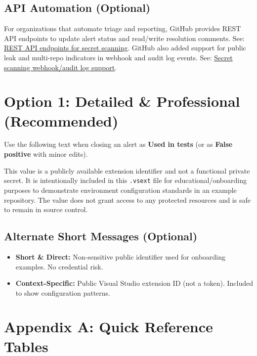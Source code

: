 \documentclass[11pt]{article}
\providecommand{\term}[1]{\textbf{#1}}
\newcommand{\codeinline}[1]{\texttt{#1}}
\begin{document}
\subsection{API Automation (Optional)}
For organizations that automate triage and reporting, GitHub provides REST API endpoints to update alert status and read/write resolution comments. See: \href{https://docs.github.com/en/rest/secret-scanning/secret-scanning}{REST API endpoints for secret scanning}. GitHub also added support for public leak and multi-repo indicators in webhook and audit log events. See: \href{https://github.blog/changelog/2024-10-24-secret-scanning-support-for-public-leak-and-multi-repository-indicators-in-webhook-and-audit-log-events/}{Secret scanning webhook/audit log support}.

\section{Option 1: Detailed \& Professional (Recommended)}
Use the following text when closing an alert as \term{Used in tests} (or as \term{False positive} with minor edits).

\begin{tcolorbox}[colback=LightGray,colframe=Gray,title=Dismissal Message (Detailed \& Professional)]
This value is a publicly available extension identifier and not a functional private secret. It is intentionally included in this \codeinline{.vsext} file for educational/onboarding purposes to demonstrate environment configuration standards in an example repository. The value does not grant access to any protected resources and is safe to remain in source control.
\end{tcolorbox}

\subsection{Alternate Short Messages (Optional)}
\begin{itemize}
  \item \textbf{Short \& Direct:} Non-sensitive public identifier used for onboarding examples. No credential risk.
  \item \textbf{Context-Specific:} Public Visual Studio extension ID (not a token). Included to show configuration patterns.
\end{itemize}

\section{Appendix A: Quick Reference Tables}
\end{document}
